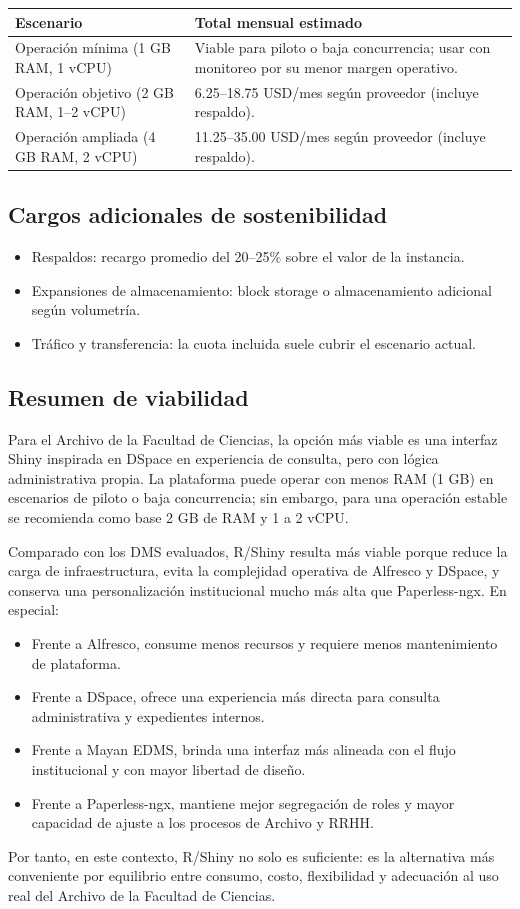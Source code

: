\begin{longtable}{p{} p{}}
\toprule
\textbf{Escenario} & \textbf{Total mensual estimado} \\
\midrule
Operación mínima (1 GB RAM, 1 vCPU) & Viable para piloto o baja concurrencia; usar con monitoreo por su menor margen operativo. \\
Operación objetivo (2 GB RAM, 1--2 vCPU) & 6.25--18.75 USD/mes según proveedor (incluye respaldo). \\
Operación ampliada (4 GB RAM, 2 vCPU) & 11.25--35.00 USD/mes según proveedor (incluye respaldo). \\
\bottomrule
\end{longtable}

\subsection{Cargos adicionales de sostenibilidad}
\begin{itemize}
  \item Respaldos: recargo promedio del 20--25\% sobre el valor de la instancia.
  \item Expansiones de almacenamiento: block storage o almacenamiento adicional según volumetría.
  \item Tráfico y transferencia: la cuota incluida suele cubrir el escenario actual.
\end{itemize}

\subsection{Resumen de viabilidad}
Para el Archivo de la Facultad de Ciencias, la opción más viable es una interfaz Shiny inspirada en DSpace en experiencia de consulta, pero con lógica administrativa propia. La plataforma puede operar con menos RAM (1 GB) en escenarios de piloto o baja concurrencia; sin embargo, para una operación estable se recomienda como base 2 GB de RAM y 1 a 2 vCPU.

Comparado con los DMS evaluados, R/Shiny resulta más viable porque reduce la carga de infraestructura, evita la complejidad operativa de Alfresco y DSpace, y conserva una personalización institucional mucho más alta que Paperless-ngx. En especial:

\begin{itemize}
  \item Frente a Alfresco, consume menos recursos y requiere menos mantenimiento de plataforma.
  \item Frente a DSpace, ofrece una experiencia más directa para consulta administrativa y expedientes internos.
  \item Frente a Mayan EDMS, brinda una interfaz más alineada con el flujo institucional y con mayor libertad de diseño.
  \item Frente a Paperless-ngx, mantiene mejor segregación de roles y mayor capacidad de ajuste a los procesos de Archivo y RRHH.
\end{itemize}

Por tanto, en este contexto, R/Shiny no solo es suficiente: es la alternativa más conveniente por equilibrio entre consumo, costo, flexibilidad y adecuación al uso real del Archivo de la Facultad de Ciencias.

